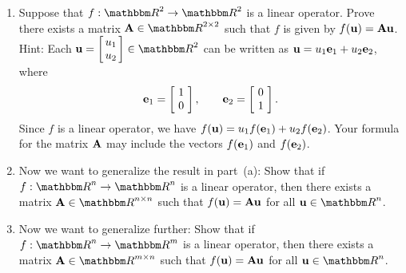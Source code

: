 
\begin{enumerate}
\item Suppose that $f: \R^2 \to \R^2$ is a linear operator. Prove there exists a matrix $\BA\in\R^{2\times 2}$ such that $f$ is given by $f({\bf u}) = {\bf A}{\bf u}$. Hint: Each $\Bu  = \left[\!\!\begin{array}{c} u_1 \\ u_2\end{array}\!\!\right] \in \R^2$ can be written as ${\bf u} = u_1 {\bf e}_1 + u_2 {\bf e}_2$, where
\[
{\bf e}_1 = \left[\!\begin{array}{c} 1 \\ 0\end{array}\!\right], \qquad {\bf e}_2 = \left[\!\begin{array}{c} 0 \\ 1\end{array}\!\right].
\] 
Since $f$ is a linear operator, we have $f({\bf u}) =  u_1 f({\bf e}_1) + u_2 f({\bf e}_2)$. Your formula for the matrix ${\bf A}$ may include the vectors $f({\bf e}_1)$ and $f({\bf e}_2)$.
\\
\item Now we want to generalize the result in part~(a): Show that if $f: \R^n \to \R^n$ is a linear operator, then there exists a matrix $\BA\in\Rnn$ such that $f({\bf u}) = {\bf A}{\bf u}$ for all $\Bu\in\Rn$.
\\
\item Now we want to generalize further: Show that if $f: \R^n \to \R^m$ is a linear operator, then there exists a matrix $\BA\in\Rmn$ such that $f({\bf u}) = {\bf A}{\bf u}$ for all $\Bu\in\Rn$.
\end{enumerate}



